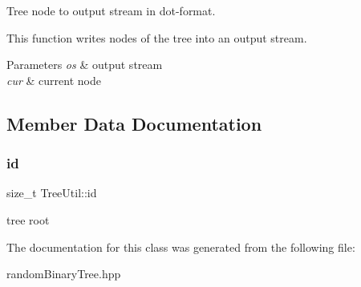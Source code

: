 Tree node to output stream in dot-\/format. 

This function writes nodes of the tree into an output stream.


\begin{DoxyParams}{Parameters}
{\em os} & output stream \\
\hline
{\em cur} & current node \\
\hline
\end{DoxyParams}


\subsection{Member Data Documentation}
\mbox{\label{classTreeUtil_a9b39a7cbe992826ad451627f87277804}} 
\subsubsection{\texorpdfstring{id}{id}}
{\footnotesize\ttfamily size\+\_\+t Tree\+Util\+::id}

tree root 

The documentation for this class was generated from the following file\+:\begin{DoxyCompactItemize}
\item 
random\+Binary\+Tree.\+hpp\end{DoxyCompactItemize}
